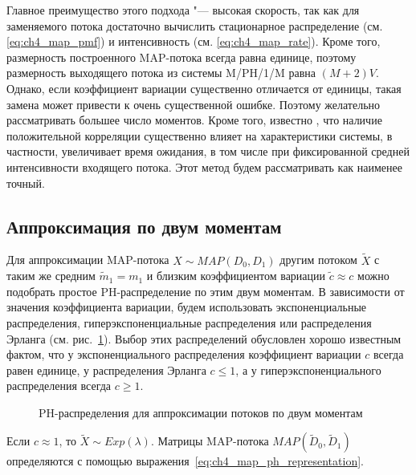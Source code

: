 Главное преимущество этого подхода "--- высокая скорость, так как для заменяемого потока достаточно вычислить стационарное распределение (см. \eqref{eq:ch4_map_pmf}) и интенсивность (см. \eqref{eq:ch4_map_rate}). Кроме того, размерность построенного MAP-потока всегда равна единице, поэтому размерность выходящего потока из системы M/PH/1/M равна $(M+2)V$. Однако, если коэффициент вариации существенно отличается от единицы, такая замена может привести к очень существенной ошибке. Поэтому желательно рассматривать большее число моментов. Кроме того, известно \cite{Dudin2001}, что наличие положительной корреляции существенно влияет на характеристики системы, в частности, увеличивает время ожидания, в том числе при фиксированной средней интенсивности входящего потока. Этот метод будем рассматривать как наименее точный.


\subsection{Аппроксимация по двум моментам}\label{sec:ch4_approx_m2}

Для аппроксимации MAP-потока $X \sim MAP(D_0, D_1)$ другим потоком $\tilde{X}$ с таким же средним $\tilde{m}_1 = m_1$ и близким коэффициентом вариации $\tilde{c} \approx c$ можно подобрать простое PH-распределение по этим двум моментам. В зависимости от значения коэффициента вариации, будем использовать экспоненциальные распределения, гиперэкспоненциальные распределения или распределения Эрланга (см. рис.~\ref{fig:ch4_ph2}). Выбор этих распределений обусловлен хорошо известным фактом, что у экспоненциального распределения коэффициент вариации $c$ всегда равен единице, у распределения Эрланга $c \leqslant 1$, а у гиперэкспоненциального распределения всегда $c \geqslant 1$.

\begin{figure}[h]
  \caption{PH-распределения для аппроксимации потоков по двум моментам}
  \label{fig:ch4_ph2}
\end{figure}

Если $c \approx 1$, то $\tilde{X} \sim Exp(\lambda)$. Матрицы MAP-потока $MAP(\tilde{D}_0, \tilde{D}_1)$ определяются с помощью выражения~\eqref{eq:ch4_map_ph_representation}.

